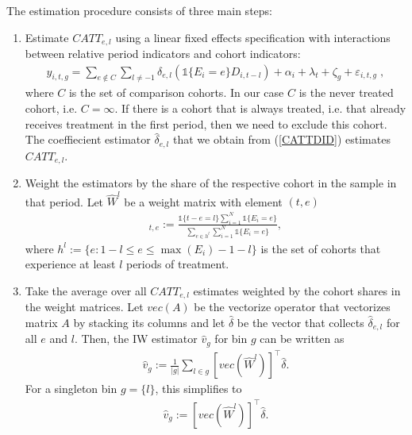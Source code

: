 The estimation procedure consists of three main steps:
\begin{enumerate}
	\item Estimate $CATT_{e, l}$ using a linear fixed effects specification with interactions between relative period indicators and cohort indicators:
	\begin{align} \label{CATTDID}
		y_{i, t, g} = \sum_{e \notin C}^{}\sum_{l \neq -1}^{} \delta_{e, l} (\mathds{1}\{E_i = e\} D_{i, t-l}) + \alpha_i + \lambda_t + \zeta_g + \varepsilon_{i, t, g} \;,
	\end{align}
	where $C$ is the set of comparison cohorts. In our case $C$ is the never treated cohort, i.e. $C = {\infty}$. If there is a cohort that is always treated, i.e. that already receives treatment in the first period, then we need to exclude this cohort. The coeffiecient estimator $\widehat{\delta}_{e, l}$ that we obtain from (\ref{CATTDID}) estimates $CATT_{e, l}$.
	
	\item Weight the estimators by the share of the respective cohort in the sample in that period. Let $\hat{W}^l$ be a weight matrix with element $(t, e)$
	\begin{align*}
		[\widehat{W}^l]_{t, e} := \frac{\mathds{1}\{t - e = l\} \sum_{i = 1}^{N} \mathds{1}\{E_i = e\}}{\sum_{e \in h^{l}} \sum_{i = 1}^{N} \mathds{1}\{E_i = e\}},
	\end{align*}
	where $h^{l} := \{e: 1 - l \leq e \leq \max(E_i) - 1 - l\}$ is the set of cohorts that experience at least $l$ periods of treatment.
	
	\item Take the average over all $CATT_{e, l}$ estimates weighted by the cohort shares in the weight matrices. Let $vec(A)$ be the vectorize operator that vectorizes matrix $A$ by stacking its columns and let $\widehat{\delta}$ be the vector that collects $\widehat{\delta}_{e, l}$ for all $e$ and $l$. Then, the IW estimator $\widehat{v}_g$ for bin $g$ can be written as 
	\begin{align}
		\widehat{v}_g := \frac{1}{|g|} \sum_{l \in g} [vec(\widehat{W}^l)]^\intercal \widehat{\delta}.
	\end{align}
	For a singleton bin $g = \{l\}$, this simplifies to
	\begin{align*}
		\widehat{v}_{g} := [vec(\widehat{W}^l)]^\intercal \widehat{\delta}.
	\end{align*}
	
\end{enumerate}

